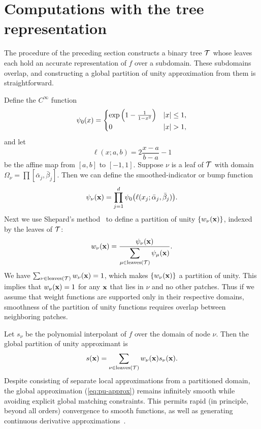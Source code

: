 \section{Computations with the tree representation}
\label{sec:operations}

The procedure of the preceding section constructs a binary tree $\mathcal{T}$ whose leaves each hold an accurate representation of $f$ over a subdomain. These subdomains overlap, and constructing a global partition of unity approximation from them is straightforward.

Define the $C^\infty$ function
\begin{align}
  \label{eq:basic-cinf}
  \psi_0(x) = \begin{cases}
    \exp \left(  1 - \frac{1}{1-x^2}\right) & |x| \leq 1, \\
    0 & |x| > 1,
  \end{cases}
\end{align}
and let
\begin{equation}
  \label{eq:affine}
  \ell(x;a,b) = 2\frac{x-a}{b-a} - 1
\end{equation}
be the affine map from $[a,b]$ to $[-1,1]$. Suppose $\nu$ is a leaf of $\mathcal{T}$ with domain $\Omega_\nu = \prod [\bar{\alpha}_j,\bar{\beta}_j]$. Then we can define the smoothed-indicator or bump function
\begin{equation}
  \label{eq:bump-functions}
  \psi_\nu(\mathbf{x}) = \prod_{j=1}^d \psi_0\bigl( \ell(x_j;\bar{\alpha}_{j},\bar{\beta}_{j}) \bigr).
\end{equation}
Next we use Shepard's method~\cite{wendland2004scattered} to define a partition of unity $\{w_\nu (\mathbf{x})\}$, indexed by the leaves of $\mathcal{T}$:
\begin{equation}
  \label{eq:pu-weight}
  w_\nu(\mathbf{x}) = \frac{\psi_\nu(\mathbf{x})}{\displaystyle \sum_{\mu\in \text{leaves}(\mathcal{T})} \psi_\mu(\mathbf{x})}.
\end{equation}
We have $\sum_{\nu\in \text{leaves}(\mathcal{T})} w_\nu(\mathbf{x}) = 1$, which makes $\{w_\nu (\mathbf{x})\}$ a partition of unity. This implies that  $w_\nu(\mathbf{x})=1$ for any $\mathbf{x}$ that lies in $\nu$ and no other patches. Thus if we assume that weight functions are supported only in their respective domains, smoothness of the partition of unity functions requires overlap between neighboring patches.

 Let $s_\nu$ be the polynomial interpolant of $f$ over the domain of node $\nu$. Then the global partition of unity approximant is
\begin{equation}
  s(\mathbf{x}) = \sum_{\nu\in \text{leaves}(\mathcal{T})} w_\nu(\mathbf{x})s_\nu(\mathbf{x}).
  \label{eq:pu-approx}	
\end{equation}
Despite consisting of separate local approximations from a partitioned domain, the global approximation (\ref{eq:pu-approx}) remains infinitely smooth while avoiding explicit global matching constraints. This permits rapid (in principle, beyond all orders) convergence to smooth functions, as well as generating continuous derivative approximations~\cite{wendland2004scattered}.

